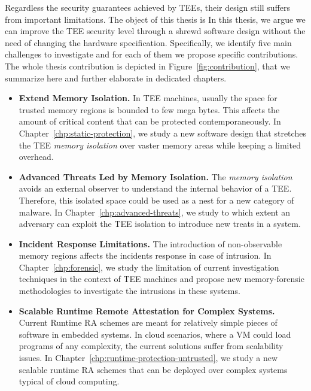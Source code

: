 Regardless the security guarantees achieved by TEEs, their design still 
suffers from important limitations.
The object of this thesis is
In this thesis, we argue we can improve the TEE security level
through a shrewd software design without the need of changing the hardware 
specification.
Specifically, we identify five main challenges to investigate and for each of 
them we propose specific contributions.
The whole thesis contribution is depicted in 
Figure~\ref{fig:contribution}, that we summarize here and further elaborate in 
dedicated chapters.

\begin{itemize}
	\item[\circledrA{1}] \textbf{Extend Memory Isolation.}
	In TEE machines, usually the space for trusted memory regions is bounded 
	to few mega bytes. 
	This affects the amount of critical content that can be protected 	
	contemporaneously.
	In Chapter~\ref{chp:static-protection}, we study a new software design that 
	stretches the TEE \emph{memory isolation} over vaster memory areas while 
	keeping a limited overhead.
	
	\item[\circledrA{2}] \textbf{Advanced Threats Led by Memory Isolation.} The 
	\emph{memory isolation} avoids an external observer to understand the 
	internal behavior of a TEE. Therefore, this isolated space could 
	be used as a nest for a new category of malware.
	In Chapter~\ref{chp:advanced-threats}, we study to which extent an 
	adversary can exploit the TEE isolation to introduce new treats in a system.

	\item[\circledrA{3}]
	\textbf{Incident Response Limitations.} The introduction of 
	non-observable memory regions affects the incidents response in 
	case of intrusion.
	In Chapter~\ref{chp:forensic}, we study the limitation of current 
	investigation techniques in the context of TEE machines and propose new 
	memory-forensic methodologies to investigate the intrusions in these 
	systems.
	
	\item[\circledrA{4}]
	\textbf{Scalable Runtime Remote Attestation for Complex Systems.}
	Current Runtime RA schemes are meant for relatively simple pieces of 
	software in embedded systems.
	In cloud scenarios, where a VM could load programs of any complexity, the 
	current solutions suffer from scalability issues.
	In Chapter~\ref{chp:runtime-protection-untrusted}, we study a new scalable 
	runtime RA schemes that can be deployed over 
	complex systems typical of cloud computing.
	

\end{itemize}
